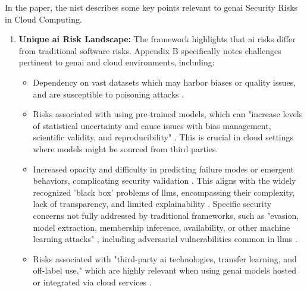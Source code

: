 In the paper, the \gls{nist} describes some key points relevant to \gls{genai} Security Risks in Cloud Computing.
\begin{enumerate}
\item \textbf{Unique \gls{ai} Risk Landscape:} The framework highlights that \gls{ai} risks differ from traditional software risks. Appendix B specifically notes challenges pertinent to \gls{genai} and cloud environments, including:
\begin{itemize}
\item Dependency on vast datasets which may harbor biases or quality issues, and are susceptible to poisoning attacks \cite{tabassi_artificial_2023}.
\item Risks associated with using pre-trained models, which can "increase levels of statistical uncertainty and cause issues with bias management, scientific validity, and reproducibility" \cite[p.38]{tabassi_artificial_2023}. This is crucial in cloud settings where models might be sourced from third parties.
\item Increased opacity and difficulty in predicting failure modes or emergent behaviors, complicating security validation \cite{tabassi_artificial_2023}. This aligns with the widely recognized 'black box' problems of \glspl{llm}, encompassing their complexity, lack of transparency, and limited explainability \cite{dash_zero-trust_2024}. Specific security concerns not fully addressed by traditional frameworks, such as "evasion, model extraction, membership inference, availability, or other machine learning attacks" \cite[p.39]{tabassi_artificial_2023}, including adversarial vulnerabilities common in \glspl{llm} \cite{dash_zero-trust_2024}.
\item Risks associated with "third-party \gls{ai} technologies, transfer learning, and off-label use," which are highly relevant when using \gls{genai} models hosted or integrated via cloud services \cite[p.39]{tabassi_artificial_2023}.
\end{itemize}


\end{enumerate}
